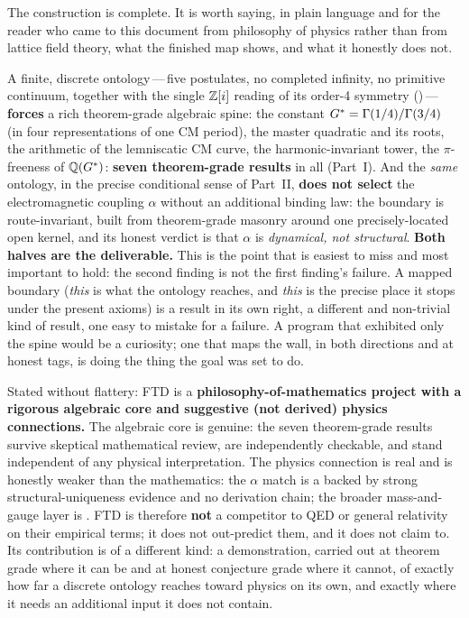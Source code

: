 \noindent The construction is complete. It is worth saying, in plain language and
for the reader who came to this document from philosophy of physics rather than
from lattice field theory, what the finished map shows, and what it honestly
does not.

 A finite, discrete ontology\,---\,five
postulates, no completed infinity, no primitive continuum, together with the
single $\mathbb{Z}[i]$ reading of its order-4 symmetry ()\,---\,\textbf{forces}
a rich theorem-grade algebraic spine: the constant $G^{*}=\Gamma(1/4)/\Gamma(3/4)$
(in four representations of one CM period), the master quadratic and its
roots, the arithmetic of the lemniscatic CM curve, the harmonic-invariant tower,
the $\pi$-freeness of $\mathbb{Q}(G^{*})$: \textbf{seven theorem-grade results} in all
(Part~I). And the \emph{same} ontology, in the precise conditional sense of
Part~II, \textbf{does not select} the electromagnetic coupling $\alpha$ without an
additional binding law: the boundary is route-invariant, built from
theorem-grade masonry around one precisely-located open kernel, and its honest
verdict is that $\alpha$ is \emph{dynamical, not structural}. \textbf{Both
halves are the deliverable.} This is the point that is easiest to miss and most
important to hold: the second finding is not the first finding's failure. A
mapped boundary (\emph{this} is what the ontology reaches, and \emph{this} is the
precise place it stops under the present axioms) is a result in its own right, a
different and non-trivial kind of result, one easy to mistake for a failure. A
program that exhibited only the spine would be a curiosity; one that maps the
wall, in both directions and at honest tags, is doing the thing the goal was set
to do.

 Stated without flattery: FTD is a
\textbf{philosophy-of-mathematics project with a rigorous algebraic core and
suggestive (not derived) physics connections.} The algebraic core is
genuine: the seven theorem-grade results survive skeptical mathematical review,
are independently checkable, and stand independent of any physical
interpretation. The physics connection is real and is honestly weaker than the
mathematics: the $\alpha$ match is a  backed by strong
structural-uniqueness evidence and no derivation chain; the broader mass-and-gauge
layer is . FTD is therefore \textbf{not} a competitor to QED or general
relativity on their empirical terms; it does not out-predict them, and it
does not claim to. Its contribution is of a different kind: a demonstration,
carried out at theorem grade where it can be and at honest conjecture grade where
it cannot, of exactly how far a discrete ontology reaches toward physics on its
own, and exactly where it needs an additional input it does not contain.

